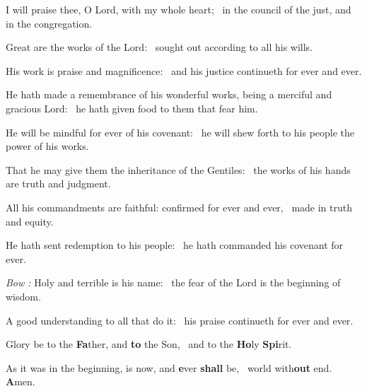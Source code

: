 \documentclass[12pt]{book} %
\newenvironment{psalmtext}{\leftskip 0.25in}{\vspace{2 mm}}
\let\oldgresixstar\gresixstar
\renewcommand{\gresixstar}{\textcolor{benred8}{\oldgresixstar}}
\begin{document}
\begin{psalmtext}
I will praise thee, O Lord, with my whole heart; \gresixstar\ in the council of the just, and in the congregation.

Great are the works of the Lord: \gresixstar\ sought out according to all his wills.

His work is praise and magnificence: \gresixstar\ and his justice continueth for ever and ever.

He hath made a remembrance of his wonderful works, being a merciful and gracious Lord: \gresixstar\ he hath given food to them that fear him.

He will be mindful for ever of his covenant: \gresixstar\ he will shew forth to his people the power of his works.

That he may give them the inheritance of the Gentiles: \gresixstar\ the works of his hands are truth and judgment.

All his commandments are faithful: confirmed for ever and ever, \gresixstar\ made in truth and equity.

He hath sent redemption to his people: \gresixstar\ he hath commanded his covenant for ever.

\textcolor{benred8}{\emph{Bow :}} Holy and terrible is his name: \gresixstar\ the fear of the Lord is the beginning of wisdom.

A good understanding to all that do it: \gresixstar\ his praise continueth for ever and ever.

Glory be to the \textbf{Fa}ther, and \textbf{to} the Son, \gresixstar\ and to the \textbf{Ho}ly \textbf{Spi}rit.

As it was in the beginning, is now, and \textbf{e}ver \textbf{shall} be, \gresixstar\ world with\textbf{out} end. \textbf{A}men.

\end{psalmtext}
\end{document}
